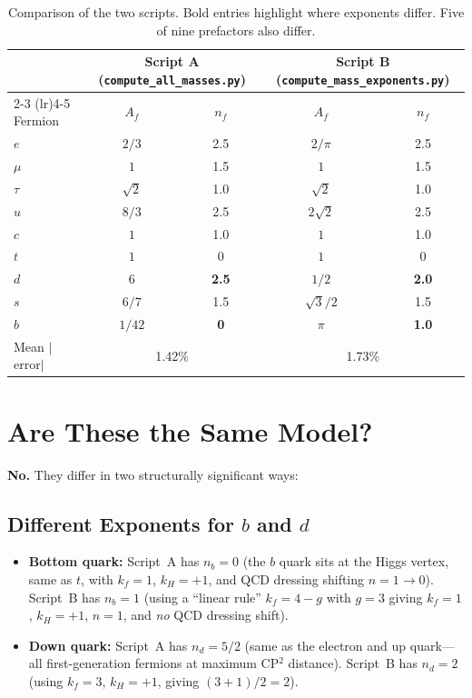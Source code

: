 \documentclass[11pt,a4paper]{article}
\begin{document}
\begin{table}[h]
\centering
\renewcommand{\arraystretch}{1.15}
\begin{tabular}{@{}l cc cc@{}}
\toprule
& \multicolumn{2}{c}{\textbf{Script A} (\texttt{compute\_all\_masses.py})}
& \multicolumn{2}{c}{\textbf{Script B} (\texttt{compute\_mass\_exponents.py})} \\
\cmidrule(lr){2-3} \cmidrule(lr){4-5}
Fermion & $A_f$ & $n_f$ & $A_f$ & $n_f$ \\
\midrule
$e$   & $2/3$   & 2.5 & $2/\pi$      & 2.5 \\
$\mu$ & $1$     & 1.5 & $1$          & 1.5 \\
$\tau$& $\sqrt{2}$ & 1.0 & $\sqrt{2}$ & 1.0 \\
$u$   & $8/3$   & 2.5 & $2\sqrt{2}$  & 2.5 \\
$c$   & $1$     & 1.0 & $1$          & 1.0 \\
$t$   & $1$     & 0   & $1$          & 0   \\
$d$   & $6$     & \textbf{2.5} & $1/2$  & \textbf{2.0} \\
$s$   & $6/7$   & 1.5 & $\sqrt{3}/2$ & 1.5 \\
$b$   & $1/42$  & \textbf{0}   & $\pi$  & \textbf{1.0} \\
\midrule
Mean $|$error$|$ & \multicolumn{2}{c}{1.42\%} & \multicolumn{2}{c}{1.73\%} \\
\bottomrule
\end{tabular}
\caption{Comparison of the two scripts.  Bold entries highlight where
exponents differ.  Five of nine prefactors also differ.}
\label{tab:comparison}
\end{table}

\section{Are These the Same Model?}
\label{sec:same}

\textbf{No.}  They differ in two structurally significant ways:

\subsection{Different Exponents for $b$ and $d$}

\begin{itemize}
\item \textbf{Bottom quark:}
  Script~A has $n_b = 0$ (the $b$ quark sits at the Higgs vertex, same as $t$,
  with $k_f = 1$, $k_H = +1$, and QCD dressing shifting $n = 1 \to 0$).
  Script~B has $n_b = 1$ (using a ``linear rule'' $k_f = 4 - g$ with $g = 3$
  giving $k_f = 1$, $k_H = +1$, $n = 1$, and \emph{no} QCD dressing shift).

\item \textbf{Down quark:}
  Script~A has $n_d = 5/2$ (same as the electron and up quark---all
  first-generation fermions at maximum CP$^2$ distance).
  Script~B has $n_d = 2$ (using $k_f = 3$, $k_H = +1$, giving $(3+1)/2 = 2$).
\end{itemize}
\end{document}
